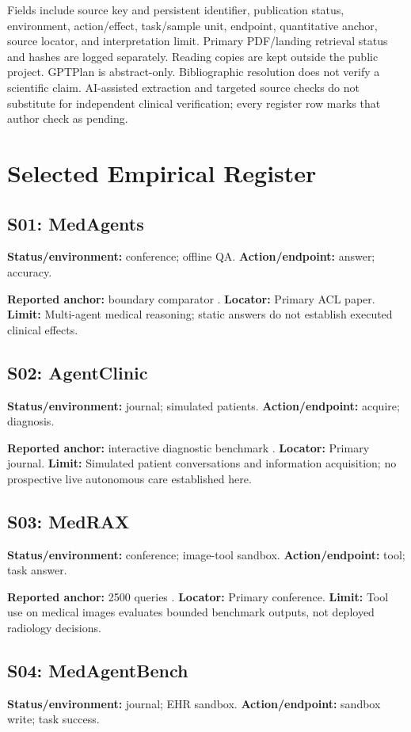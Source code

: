 \documentclass[journal,10pt]{IEEEtran}
\begin{document}
Fields include source key and persistent identifier, publication status, environment, action/effect, task/sample unit, endpoint, quantitative anchor, source locator, and interpretation limit. Primary PDF/landing retrieval status and hashes are logged separately. Reading copies are kept outside the public project. GPTPlan is abstract-only. Bibliographic resolution does not verify a scientific claim. AI-assisted extraction and targeted source checks do not substitute for independent clinical verification; every register row marks that author check as pending.
\section{Selected Empirical Register}
\subsection{S01: MedAgents}
\textbf{Status/environment:} conference; offline QA. \textbf{Action/endpoint:} answer; accuracy.

\textbf{Reported anchor:} boundary comparator \cite{medagents2024}. \textbf{Locator:} Primary ACL paper. \textbf{Limit:} Multi-agent medical reasoning; static answers do not establish executed clinical effects.

\subsection{S02: AgentClinic}
\textbf{Status/environment:} journal; simulated patients. \textbf{Action/endpoint:} acquire; diagnosis.

\textbf{Reported anchor:} interactive diagnostic benchmark \cite{agentclinic2026}. \textbf{Locator:} Primary journal. \textbf{Limit:} Simulated patient conversations and information acquisition; no prospective live autonomous care established here.

\subsection{S03: MedRAX}
\textbf{Status/environment:} conference; image-tool sandbox. \textbf{Action/endpoint:} tool; task answer.

\textbf{Reported anchor:} 2500 queries \cite{medrax2025}. \textbf{Locator:} Primary conference. \textbf{Limit:} Tool use on medical images evaluates bounded benchmark outputs, not deployed radiology decisions.

\subsection{S04: MedAgentBench}
\textbf{Status/environment:} journal; EHR sandbox. \textbf{Action/endpoint:} sandbox write; task success.
\end{document}
